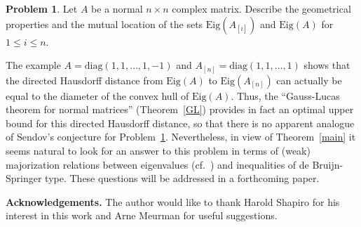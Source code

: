 \documentclass[10pt,twoside,a4paper,reqno]{amsart}
\theoremstyle{plain}
\theoremstyle{definition}
\newtheorem{problem}  {Problem}
\begin{document}
{\begin{problem}\label{norm}
Let $A$ be a normal $n\times n$ complex matrix. Describe the geometrical 
properties and the mutual location of the sets $\text{Eig}(A_{[i]})$ and 
$\text{Eig}(A)$ for $1\le i\le n$.
\end{problem}

The example $A=\text{diag}(1,1,\ldots,1,-1)$ and 
$A_{[n]}=\text{diag}(1,1,\ldots,1)$ shows that the directed Hausdorff distance
from
$\text{Eig}(A)$ to $\text{Eig}(A_{[n]})$ can actually be equal to the 
diameter of the convex hull of $\text{Eig}(A)$. Thus, the ``Gauss-Lucas 
theorem for normal matrices'' (Theorem~\ref{GL}) provides in fact an optimal 
upper bound 
for this directed Hausdorff distance, so that there is no apparent analogue 
of Sendov's 
conjecture for Problem~\ref{norm}. Nevertheless, in view of Theorem~\ref{main}
it seems natural to look for an answer to this problem in terms of (weak) 
majorization relations between eigenvalues (cf.~\cite{MO}) and inequalities of 
de Bruijn-Springer type. These 
questions will be addressed in a forthcoming paper.

\medskip

\noindent
{\bf Acknowledgements.} The author would like to thank Harold Shapiro for 
his interest in this work and Arne Meurman for useful suggestions.}
\end{document}
